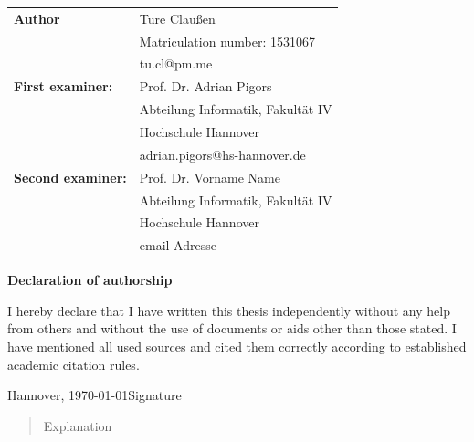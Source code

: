 \documentclass[fontsize=12pt,paper=a4,twoside,parskip=half-,headsepline,headinclude, abstract=on]{scrreprt}
\begin{document}
\newpage \thispagestyle{empty}
\begin{tabular}{ll}
    {\bfseries\sffamily Author}           & Ture Claußen                      \\
                                          & Matriculation number: 1531067     \\
                                          & tu.cl@pm.me                       \\[5ex]
    {\bfseries\sffamily First examiner:}  & Prof. Dr. Adrian Pigors           \\
                                          & Abteilung Informatik, Fakultät IV \\
                                          & Hochschule Hannover               \\
                                          & adrian.pigors@hs-hannover.de      \\[5ex]
    {\bfseries\sffamily Second examiner:} & Prof. Dr. Vorname Name            \\
                                          & Abteilung Informatik, Fakultät IV \\
                                          & Hochschule Hannover               \\
                                          & email-Adresse
\end{tabular}

\vfill

\begin{center} \sffamily\bfseries Declaration of authorship \end{center}

I hereby declare that I have written this thesis independently without any help from others and without the use of documents or aids other than those stated. I have mentioned all used sources and cited them correctly according to established academic citation rules.
\vspace*{7ex}

Hannover, \today \hfill Signature
\tableofcontents

\begin{abstract}
    Explanation
\end{abstract}










\end{document}
